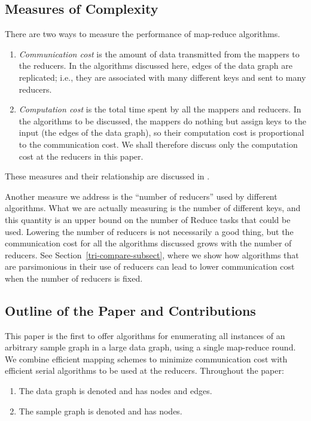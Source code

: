 \subsection{Measures of Complexity}
\label{costs-subsect}

There are two ways to measure the performance of map-reduce algorithms.

\begin{enumerate}
\item {\em Communication cost} is the amount of data transmitted from the mappers to the reducers.  In the algorithms discussed here, edges of the data graph are replicated; i.e., they are associated with many different keys and sent to many reducers.

\item {\em Computation cost} is the total time spent by all the mappers and reducers. In the algorithms to be discussed, the mappers do nothing but assign keys to the input (the edges of the data graph), so their computation cost is proportional to the communication cost. We shall therefore discuss only the computation cost at the reducers in this paper.
\end{enumerate}
These measures and their relationship are discussed in \cite{ABCPU-EDBT11}.

Another measure we address is the ``number of reducers'' used by different algorithms. What we are actually measuring is the number of different keys, and this quantity is an upper bound on the number of Reduce tasks that could be used.  Lowering the number of reducers is not necessarily a good thing, but the communication cost for all the algorithms discussed grows with the number of reducers.  See Section~\ref{tri-compare-subsect}, where we show how algorithms that are parsimonious in their use of reducers can lead to lower communication cost when the number of reducers is fixed.


\subsection{Outline of the Paper and Contributions}
\label{outline-subsect}

This paper is the first to offer algorithms for enumerating all instances of an arbitrary sample graph in a large data graph, using a single map-reduce round.  We combine efficient mapping schemes to minimize communication cost with efficient serial algorithms to be used at the reducers.
Throughout the paper:

\begin{enumerate}
\item The data graph is denoted  and has  nodes and  edges.

\item The sample graph is denoted  and has  nodes.
\end{enumerate}

